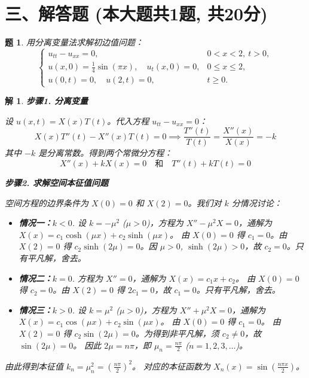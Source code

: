 \documentclass[12pt,a4paper]{article}
\newtheorem{problem}{题}
\newtheorem*{solution}{解}
\begin{document}
	\section*{三、解答题 (本大题共1题, 共20分)}
	\begin{problem}
		用分离变量法求解初边值问题：
		\[
		\begin{cases}
			u_{tt} - u_{xx} = 0, & 0 < x < 2, \ t > 0, \\
			u(x, 0) = \frac{1}{4}\sin(\pi x), \quad u_t(x, 0) = 0, & 0 \leq x \leq 2, \\
			u(0, t) = 0, \quad u(2, t) = 0, & t \geq 0.
		\end{cases}
		\]
	\end{problem}
	\hrulefill
	\begin{solution}
		\textbf{步骤1. 分离变量}
		
		\noindent
		设 $u(x,t) = X(x)T(t)$。代入方程 $u_{tt} - u_{xx} = 0$：
		\[ X(x)T''(t) - X''(x)T(t) = 0 \implies \frac{T''(t)}{T(t)} = \frac{X''(x)}{X(x)} = -k \]
		其中 $-k$ 是分离常数。得到两个常微分方程：
		\[ X''(x) + k X(x) = 0 \quad \text{和} \quad T''(t) + k T(t) = 0 \]
		
		\hrulefill
		
		\textbf{步骤2. 求解空间本征值问题}
		
		\noindent
		空间方程的边界条件为 $X(0)=0$ 和 $X(2)=0$。我们对 $k$ 分情况讨论：
		\begin{itemize}
			\item \textbf{情况一：$k < 0$}.
			设 $k = -\mu^2$ ($\mu>0$)，方程为 $X'' - \mu^2 X = 0$，通解为 $X(x) = c_1 \cosh(\mu x) + c_2 \sinh(\mu x)$。
			由 $X(0)=0$ 得 $c_1=0$。由 $X(2)=0$ 得 $c_2 \sinh(2\mu) = 0$。因 $\mu>0$, $\sinh(2\mu) > 0$，故 $c_2=0$。只有平凡解，舍去。
			
			\item \textbf{情况二：$k = 0$}.
			方程为 $X''=0$，通解为 $X(x) = c_1 x + c_2$。
			由 $X(0)=0$ 得 $c_2=0$。由 $X(2)=0$ 得 $2c_1=0$，故 $c_1=0$。只有平凡解，舍去。
			
			\item \textbf{情况三：$k > 0$}.
			设 $k = \mu^2$ ($\mu>0$)，方程为 $X'' + \mu^2 X = 0$，通解为 $X(x) = c_1 \cos(\mu x) + c_2 \sin(\mu x)$。
			由 $X(0)=0$ 得 $c_1=0$。
			由 $X(2)=0$ 得 $c_2 \sin(2\mu) = 0$。为得到非平凡解，须 $c_2 \neq 0$，故 $\sin(2\mu)=0$。
			因此 $2\mu = n\pi$，即 $\mu_n = \frac{n\pi}{2}$ ($n=1, 2, 3, \dots$)。
		\end{itemize}
		由此得到本征值 $k_n = \mu_n^2 = \left(\frac{n\pi}{2}\right)^2$。
		对应的本征函数为 $X_n(x) = \sin\left(\frac{n\pi x}{2}\right)$。
		

\end{solution}
\end{document}
